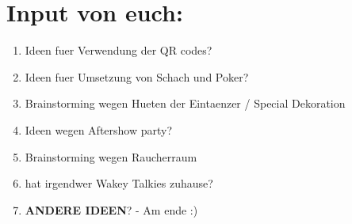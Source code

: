 \documentclass[12pt]{article}
\begin{document}
\section{Input von euch:}
\begin{enumerate}
\item Ideen fuer Verwendung der QR codes?
\item Ideen fuer Umsetzung von Schach und Poker?
\item Brainstorming wegen Hueten der Eintaenzer / Special Dekoration
\item Ideen wegen Aftershow party?
\item Brainstorming wegen Raucherraum
\item hat irgendwer Wakey Talkies zuhause?
\item \textbf{ANDERE IDEEN}? - Am ende :)
\end{enumerate}

\newpage
\end{document}
